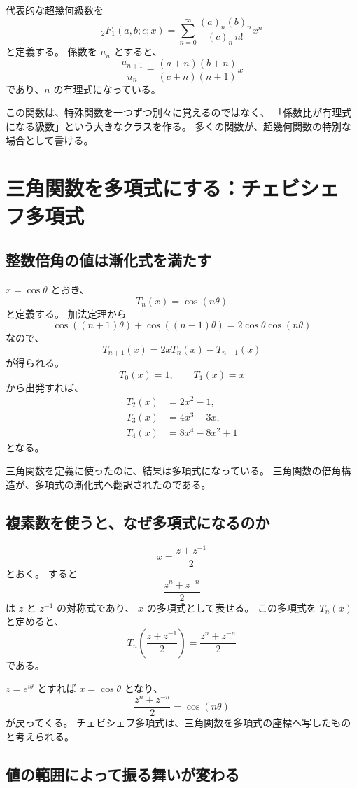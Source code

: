 代表的な超幾何級数を
\[
  {}_2F_1(a,b;c;x)
  =
  \sum_{n=0}^{\infty}
  \frac{(a)_n(b)_n}{(c)_n\,n!}x^n
\]
と定義する。
係数を $u_n$ とすると、
\[
  \frac{u_{n+1}}{u_n}
  =
  \frac{(a+n)(b+n)}{(c+n)(n+1)}x
\]
であり、$n$ の有理式になっている。

この関数は、特殊関数を一つずつ別々に覚えるのではなく、
「係数比が有理式になる級数」という大きなクラスを作る。
多くの関数が、超幾何関数の特別な場合として書ける。

\section{三角関数を多項式にする：チェビシェフ多項式}

\subsection{整数倍角の値は漸化式を満たす}

$x=\cos\theta$ とおき、
\[
  T_n(x)=\cos(n\theta)
\]
と定義する。
加法定理から
\[
  \cos((n+1)\theta)
  +\cos((n-1)\theta)
  =2\cos\theta\cos(n\theta)
\]
なので、
\[
  T_{n+1}(x)=2xT_n(x)-T_{n-1}(x)
\]
が得られる。
\[
  T_0(x)=1,\qquad T_1(x)=x
\]
から出発すれば、
\[
\begin{aligned}
  T_2(x)&=2x^2-1,\\
  T_3(x)&=4x^3-3x,\\
  T_4(x)&=8x^4-8x^2+1
\end{aligned}
\]
となる。

三角関数を定義に使ったのに、結果は多項式になっている。
三角関数の倍角構造が、多項式の漸化式へ翻訳されたのである。

\subsection{複素数を使うと、なぜ多項式になるのか}

\[
  x=\frac{z+z^{-1}}2
\]
とおく。
すると
\[
  \frac{z^n+z^{-n}}2
\]
は $z$ と $z^{-1}$ の対称式であり、
$x$ の多項式として表せる。
この多項式を $T_n(x)$ と定めると、
\[
  T_n\left(\frac{z+z^{-1}}2\right)
  =\frac{z^n+z^{-n}}2
\]
である。

$z=e^{i\theta}$ とすれば $x=\cos\theta$ となり、
\[
  \frac{z^n+z^{-n}}2=\cos(n\theta)
\]
が戻ってくる。
チェビシェフ多項式は、三角関数を多項式の座標へ写したものと考えられる。

\subsection{値の範囲によって振る舞いが変わる}

